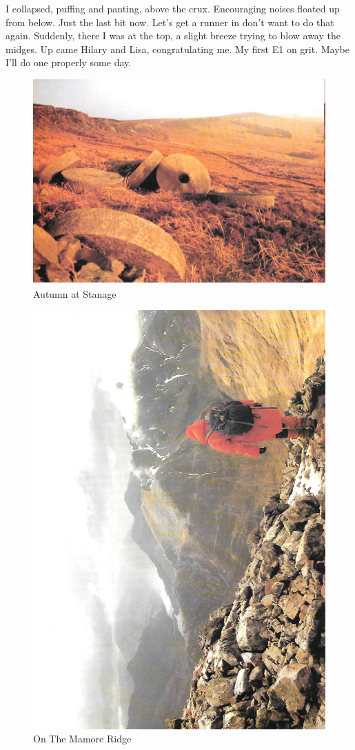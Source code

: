 \documentclass[a5paper,openany,font 10pt]{scrbook}
\begin{document}
I collapsed, puffing and panting, above the crux.
Encouraging noises floated up from below. Just the last bit now.
Let's get a runner in   don't want to do that again. Suddenly,
there I was at the top, a slight breeze trying to blow away the
midges. Up came Hilary and Lisa, congratulating me. My first E1
on grit. Maybe I'll do one properly some day.
\begin{figure}[htb]
\centering
\includegraphics[width=.9\linewidth]{./images/Autumn_Stanage.jpg}
\caption{\label{fig:orgb0741e8}
Autumn at Stanage}
\end{figure}

\begin{figure}[htb]
\centering
\includegraphics[width=.9\linewidth]{./images/On_the_Mamore_Ridge.jpg}
\caption{\label{fig:org07f2fd2}
On The Mamore Ridge}
\end{figure}
\end{document}
